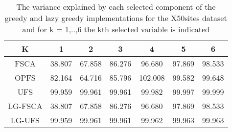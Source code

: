 \begin{table}
	\begin{center}
		\begin{tabular}{c c c c c c c}
			K & 1 & 2 & 3 & 4 & 5 & 6 \\
			\hline
			FSCA & 38.807 & 67.858 & 86.276 & 96.680 & 97.869 & 98.533 \\
			OPFS & 82.164 & 64.716 & 85.796 & 102.008 & 99.582 & 99.648 \\
			UFS & 99.959 & 99.961 & 99.961 & 99.982 & 99.997 & 99.999 \\
			LG-FSCA & 38.807 & 67.858 & 86.276 & 96.680 & 97.869 & 98.533 \\
			LG-UFS & 99.959 & 99.961 & 99.961 & 99.962 & 99.963 & 99.963 \\
		\end{tabular}
	\end{center}
	\caption{The variance explained by each selected component of the greedy and lazy greedy implementations for the X50sites dataset and for k = 1,..,6 the kth selected variable is indicated}
\end{table}